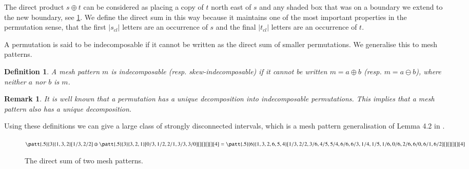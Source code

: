 \documentclass[preprint,11pt]{elsarticle}
\newtheorem{defn}[thm]{Definition}\crefname{defn}{Definition}{Definitions}
\newtheorem{rem}[thm]{Remark}\crefname{rem}{Remark}{Remarks}
\newcommand\cl[1]{#1_{cl}}
\numberwithin{equation}{section}
\numberwithin{figure}{section}
\numberwithin{thm}{section}
\begin{document}
The direct product $s\oplus t$ can be considered as placing a copy of $t$
north east of $s$ and any shaded box that was on a boundary we extend to the new boundary,
see \cref{fig:directsum}. We define the direct sum in this way because it maintains one of the most
important properties in the permutation sense, that the first $|\cl{s}|$ letters are
an occurrence of $s$ and the final $|\cl{t}|$ letters are an occurrence of $t$.

A permutation is said to be indecomposable if it cannot be written as the direct
sum of smaller permutations. We generalise this to mesh patterns.
\begin{defn}
A mesh pattern $m$ is \emph{indecomposable} (resp. \emph{skew-\linebreak indecomposable}) if it
cannot be written $m=a\oplus b$ (resp. $m=a\ominus b$), where neither $a$ nor $b$ is $m$.
\end{defn}
\begin{rem}
It is well known that a permutation has a unique decomposition into indecomposable permutations.
This implies that a mesh pattern also has a unique decomposition.
\end{rem}

Using these definitions we can give a large class of strongly disconnected intervals,
which is a mesh pattern generalisation of Lemma 4.2 in \cite{McSt13}.

\begin{figure}\centering
$\patt{.5}{3}{1,3,2}[1/3,2/2]\oplus\patt{.5}{3}{3,2,1}[0/3,1/2,2/1,3/3,3/0][][][][][4]
=\patt{.5}{6}{1,3,2,6,5,4}[1/3,2/2,3/6,4/5,5/4,6/6,6/3,1/4,1/5,1/6,0/6,2/6,6/0,6/1,6/2][][][][][4]$
\caption{The direct sum of two mesh patterns.}\label{fig:directsum}
\end{figure}
\end{document}
